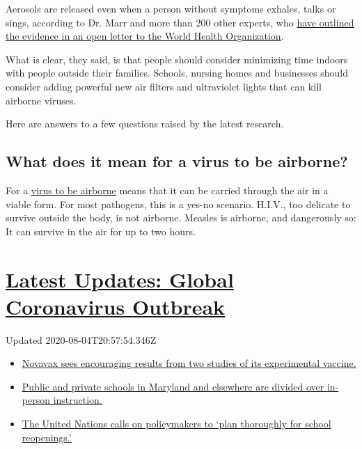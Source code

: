 Aerosols are released even when a person without symptoms exhales, talks
or sings, according to Dr. Marr and more than 200 other experts, who
\href{https://academic.oup.com/cid/article/doi/10.1093/cid/ciaa939/5867798}{have
outlined the evidence in an open letter to the World Health
Organization}.

What is clear, they said, is that people should consider minimizing time
indoors with people outside their families. Schools, nursing homes and
businesses should consider adding powerful new air filters and
ultraviolet lights that can kill airborne viruses.

Here are answers to a few questions raised by the latest research.

\hypertarget{what-does-it-mean-for-a-virus-to-be-airborne}{%
\subsection{What does it mean for a virus to be
airborne?}\label{what-does-it-mean-for-a-virus-to-be-airborne}}

For a
\href{https://www.nytimes.com/2020/07/09/health/virus-aerosols-who.html}{virus
to be airborne} means that it can be carried through the air in a viable
form. For most pathogens, this is a yes-no scenario. H.I.V., too
delicate to survive outside the body, is not airborne. Measles is
airborne, and dangerously so: It can survive in the air for up to two
hours.

\hypertarget{latest-updates-global-coronavirus-outbreak}{%
\section{\texorpdfstring{\href{https://www.nytimes.com/2020/08/04/world/coronavirus-cases.html?action=click\&pgtype=Article\&state=default\&region=MAIN_CONTENT_1\&context=storylines_live_updates}{Latest
Updates: Global Coronavirus
Outbreak}}{Latest Updates: Global Coronavirus Outbreak}}\label{latest-updates-global-coronavirus-outbreak}}

Updated 2020-08-04T20:57:54.346Z

\begin{itemize}
\tightlist
\item
  \href{https://www.nytimes.com/2020/08/04/world/coronavirus-cases.html?action=click\&pgtype=Article\&state=default\&region=MAIN_CONTENT_1\&context=storylines_live_updates\#link-1228a480}{Novavax
  sees encouraging results from two studies of its experimental
  vaccine.}
\item
  \href{https://www.nytimes.com/2020/08/04/world/coronavirus-cases.html?action=click\&pgtype=Article\&state=default\&region=MAIN_CONTENT_1\&context=storylines_live_updates\#link-4825b93}{Public
  and private schools in Maryland and elsewhere are divided over
  in-person instruction.}
\item
  \href{https://www.nytimes.com/2020/08/04/world/coronavirus-cases.html?action=click\&pgtype=Article\&state=default\&region=MAIN_CONTENT_1\&context=storylines_live_updates\#link-50f7386d}{The
  United Nations calls on policymakers to `plan thoroughly for school
  reopenings.'}
\end{itemize}

